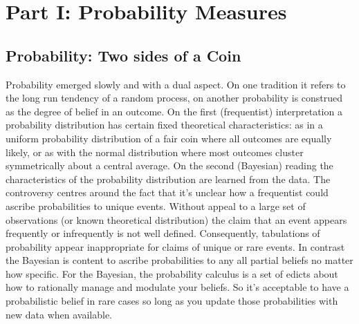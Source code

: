 \documentclass{tufte-handout}
\begin{document}
\section{\textbf{Part I: Probability Measures}}

\subsection{Probability: Two sides of a Coin}
\label{sec:Probability}
Probability emerged slowly and with a dual aspect. On one tradition it refers to the long run tendency of a random process, on another probability is construed as the degree of belief in an outcome. On the first (frequentist) interpretation a probability distribution has certain fixed theoretical characteristics: as in a uniform probability distribution of a fair coin where all outcomes are equally likely, or as with the normal distribution where most outcomes cluster symmetrically about a central average. On the second (Bayesian) reading the characteristics of the probability distribution are learned from the data. The controversy centres around the fact that it's unclear how a frequentist could ascribe probabilities to unique events. Without appeal to a large set of observations (or known theoretical distribution) the claim that an event appears frequently or infrequently is not well defined. Consequently, tabulations of probability appear inappropriate for claims of unique or rare events. In contrast the Bayesian is content to ascribe probabilities to any all partial beliefs no matter how specific. For the Bayesian, the probability calculus is a set of edicts about how to rationally manage and modulate your beliefs. So it's acceptable to have a probabilistic belief in rare cases so long as you update those probabilities with new data when available. \linebreak 
\end{document}
